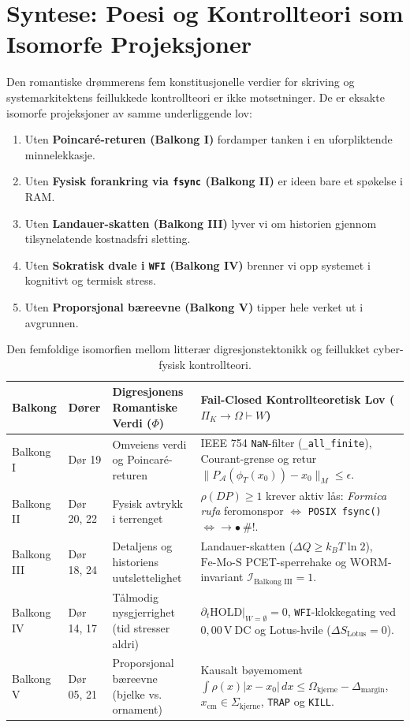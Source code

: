 \documentclass[11pt,a4paper,oneside]{book}
\theoremstyle{definition}
\begin{document}
\tableofcontents

\chapter{Syntese: Poesi og Kontrollteori som Isomorfe Projeksjoner}

Den romantiske drømmerens fem konstitusjonelle verdier for skriving og systemarkitektens feillukkede kontrollteori er ikke motsetninger. De er eksakte isomorfe projeksjoner av samme underliggende lov:
\begin{enumerate}
    \item Uten \textbf{Poincaré-returen (Balkong I)} fordamper tanken i en uforpliktende minnelekkasje.
    \item Uten \textbf{Fysisk forankring via \texttt{fsync} (Balkong II)} er ideen bare et spøkelse i RAM.
    \item Uten \textbf{Landauer-skatten (Balkong III)} lyver vi om historien gjennom tilsynelatende kostnadsfri sletting.
    \item Uten \textbf{Sokratisk dvale i \texttt{WFI} (Balkong IV)} brenner vi opp systemet i kognitivt og termisk stress.
    \item Uten \textbf{Proporsjonal bæreevne (Balkong V)} tipper hele verket ut i avgrunnen.
\end{enumerate}

\begin{table}[h!]
\centering
\small
\begin{tabularx}{\textwidth}{llXX}
\toprule
\textbf{Balkong} & \textbf{Dører} & \textbf{Digresjonens Romantiske Verdi ($\Phi$)} & \textbf{Fail-Closed Kontrollteoretisk Lov ($\Pi_K \to \Omega \vdash W$)} \\
\midrule
Balkong I & Dør 19 & Omveiens verdi og Poincaré-returen & IEEE 754 \texttt{NaN}-filter (\texttt{\_all\_finite}), Courant-grense og retur $\lVert P_{\mathcal{A}}(\phi_T(x_0)) - x_0\rVert_M \le \epsilon$. \\
Balkong II & Dør 20, 22 & Fysisk avtrykk i terrenget & $\rho(DP) \ge 1$ krever aktiv lås: \emph{Formica rufa} feromonspor $\iff$ \texttt{POSIX fsync()} $\iff \to \bullet \ \#!$. \\
Balkong III & Dør 18, 24 & Detaljens og historiens uutslettelighet & Landauer-skatten ($\Delta Q \ge k_B T \ln 2$), $\mathrm{Fe\text{-}Mo\text{-}S}$ PCET-sperrehake og WORM-invariant $\mathcal{I}_{\text{Balkong III}} = 1$. \\
Balkong IV & Dør 14, 17 & Tålmodig nysgjerrighet (tid stresser aldri) & $\left.\partial_t \mathrm{HOLD}\right|_{W=\emptyset} = 0$, \texttt{WFI}-klokkegating ved $0{,}00\,\mathrm{V\ DC}$ og Lotus-hvile ($\Delta S_{\mathrm{Lotus}} = 0$). \\
Balkong V & Dør 05, 21 & Proporsjonal bæreevne (bjelke vs. ornament) & Kausalt bøyemoment $\int \rho(x)|x-x_0|\,dx \le \Omega_{\mathrm{kjerne}} - \Delta_{\mathrm{margin}}$, $x_{\mathrm{cm}} \in \Sigma_{\mathrm{kjerne}}$, \texttt{TRAP} og \texttt{KILL}. \\
\bottomrule
\end{tabularx}
\caption{Den femfoldige isomorfien mellom litterær digresjonstektonikk og feillukket cyber-fysisk kontrollteori.}
\end{table}
\end{document}

